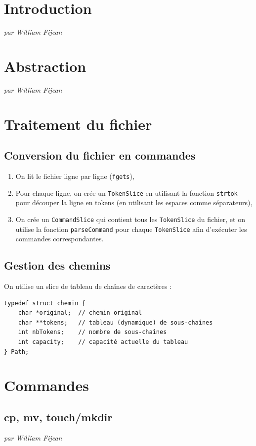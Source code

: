 \documentclass{article}
\begin{document}

\section{Introduction}
\textit{par William Fijean}

\section{Abstraction}
\textit{par William Fijean}

\section{Traitement du fichier}
\subsection{Conversion du fichier en commandes}
\begin{enumerate}
    \item On lit le fichier ligne par ligne (\texttt{fgets}),
    \item Pour chaque ligne, on crée un \texttt{TokenSlice} en utilisant la fonction \texttt{strtok} pour découper la ligne en tokens (en utilisant les espaces comme séparateurs),
    \item On crée un \texttt{CommandSlice} qui contient tous les \texttt{TokenSlice} du fichier, et on utilise la fonction \texttt{parseCommand} pour chaque \texttt{TokenSlice} afin d'exécuter les commandes correspondantes.
\end{enumerate}
\subsection{Gestion des chemins}
On utilise un slice de tableau de chaînes de caractères :
\begin{verbatim}
typedef struct chemin {
    char *original;  // chemin original
    char **tokens;   // tableau (dynamique) de sous-chaînes
    int nbTokens;    // nombre de sous-chaînes
    int capacity;    // capacité actuelle du tableau
} Path;
\end{verbatim}

\section{Commandes}
\subsection{cp, mv, touch/mkdir}
\textit{par William Fijean}
\end{document}

